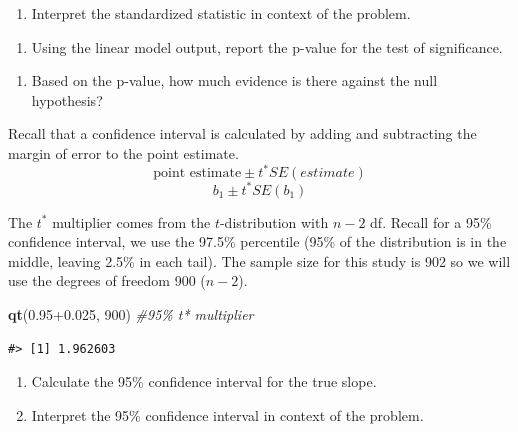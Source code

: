 \documentclass[
]{report}
\newenvironment{Shaded}{\begin{snugshade}}{\end{snugshade}}
\newcommand{\CommentTok}[1]{\textcolor[rgb]{0.56,0.35,0.01}{\textit{#1}}}
\newcommand{\DecValTok}[1]{\textcolor[rgb]{0.00,0.00,0.81}{#1}}
\newcommand{\FloatTok}[1]{\textcolor[rgb]{0.00,0.00,0.81}{#1}}
\newcommand{\KeywordTok}[1]{\textcolor[rgb]{0.13,0.29,0.53}{\textbf{#1}}}
\newcommand{\NormalTok}[1]{#1}
\providecommand{\tightlist}{%
  \setlength{\itemsep}{0pt}\setlength{\parskip}{0pt}}
\begin{document}
\vspace{1in}

\begin{enumerate}
\def\labelenumi{\arabic{enumi}.}
\setcounter{enumi}{12}
\tightlist
\item
  Interpret the standardized statistic in context of the problem.
\end{enumerate}

\vspace{0.8in}

\begin{enumerate}
\def\labelenumi{\arabic{enumi}.}
\setcounter{enumi}{13}
\tightlist
\item
  Using the linear model output, report the p-value for the test of significance.
\end{enumerate}

\vspace{0.5in}

\begin{enumerate}
\def\labelenumi{\arabic{enumi}.}
\setcounter{enumi}{14}
\tightlist
\item
  Based on the p-value, how much evidence is there against the null hypothesis?
\end{enumerate}

\vspace{0.5in}

Recall that a confidence interval is calculated by adding and subtracting the margin of error to the point estimate.\\
\[\mbox{point estimate}\pm t^*SE(estimate)\]
\[b_1 \pm t^* SE(b_1)\]

The \(t^*\) multiplier comes from the \(t\)-distribution with \(n-2\) df. Recall for a 95\% confidence interval, we use the 97.5\% percentile (95\% of the distribution is in the middle, leaving 2.5\% in each tail). The sample size for this study is 902 so we will use the degrees of freedom 900 (\(n-2\)).

\begin{Shaded}
\begin{Highlighting}[]
\KeywordTok{qt}\NormalTok{(}\FloatTok{0.95+0.025}\NormalTok{, }\DecValTok{900}\NormalTok{) }\CommentTok{\#95\% t* multiplier }
\end{Highlighting}
\end{Shaded}

\begin{verbatim}
#> [1] 1.962603
\end{verbatim}

\begin{enumerate}
\def\labelenumi{\arabic{enumi}.}
\setcounter{enumi}{15}
\item
  Calculate the 95\% confidence interval for the true slope.
  \vspace{0.8in}
\item
  Interpret the 95\% confidence interval in context of the problem.
\end{enumerate}
\end{document}
